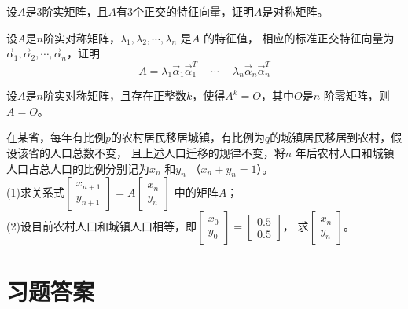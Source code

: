 \begin{ex}\label{7.25}
设$A$是3阶实矩阵，且$A$有3个正交的特征向量，证明$A$是对称矩阵。
\end{ex}

\begin{ex}\label{7.26}
设$A$是$n$阶实对称矩阵，$\lambda_1,\lambda_2,\cdots,\lambda_n$ 是$A$ 的特征值，
相应的标准正交特征向量为$\vec{\alpha}_1,\vec{\alpha}_2,\cdots,\vec{\alpha}_n$，证明
\begin{equation*}
  A = \lambda_1\vec{\alpha}_1\vec{\alpha}_1^T+\cdots+\lambda_n\vec{\alpha}_n\vec{\alpha}_n^T
\end{equation*}
\end{ex}

\begin{ex}\label{7.27}
设$A$是$n$阶实对称矩阵，且存在正整数$k$，使得$A^{k}=O$，其中$O$是$n$ 阶零矩阵，则$A=O$。
\end{ex}

\begin{ex}\label{7.28}
在某省，每年有比例$p$的农村居民移居城镇，有比例为$q$的城镇居民移居到农村，假设该省的人口总数不变，
且上述人口迁移的规律不变，将$n$ 年后农村人口和城镇人口占总人口的比例分别记为$x_n$ 和$y_n$ （$x_n+y_n=1$）。\\
(1)求关系式$\begin{bmatrix}x_{n+1}\\y_{n+1}\end{bmatrix}=A\begin{bmatrix}x_n\\y_n\end{bmatrix}$ 中的矩阵$A$；\\
(2)设目前农村人口和城镇人口相等，即$\begin{bmatrix}x_0\\y_0\end{bmatrix}=\begin{bmatrix}0.5\\0.5\end{bmatrix}$，
求$\begin{bmatrix}x_{n}\\y_{n}\end{bmatrix}$。
\end{ex}


\section{习题答案}

